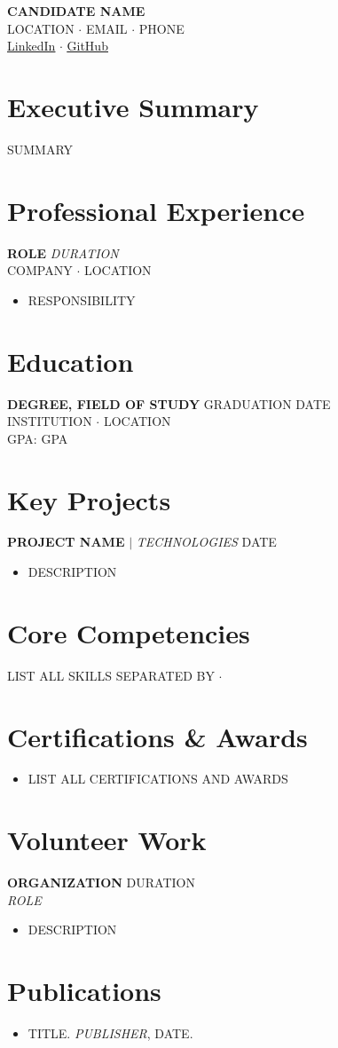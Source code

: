 \documentclass[letterpaper,11pt]{article}
\newcommand{\resumeItem}[1]{\item\small{#1\vspace{-2pt}}}
\newcommand{\resumeItemListStart}{\begin{itemize}[leftmargin=*,topsep=2pt,itemsep=1pt]}
\newcommand{\resumeItemListEnd}{\end{itemize}\vspace{-4pt}}
\begin{document}
\begin{center}
  {\LARGE\scshape\bfseries CANDIDATE NAME} \\ \vspace{6pt}
  {\color{medgray}\small LOCATION $\cdot$ EMAIL $\cdot$ PHONE} \\ \vspace{2pt}
  {\color{medgray}\small \href{LINKEDIN}{\underline{LinkedIn}} $\cdot$ \href{GITHUB}{\underline{GitHub}}}
\end{center}

\vspace{8pt}

\section{Executive Summary}
\small SUMMARY

\section{Professional Experience}
\textbf{ROLE} \hfill \textit{DURATION} \\
{\small\scshape COMPANY} $\cdot$ \small LOCATION \vspace{4pt}
\resumeItemListStart
  \resumeItem{RESPONSIBILITY}
\resumeItemListEnd

\section{Education}
\textbf{DEGREE, FIELD OF STUDY} \hfill GRADUATION DATE \\
{\small\scshape INSTITUTION} $\cdot$ LOCATION \\
\small GPA: GPA

\section{Key Projects}
\textbf{PROJECT NAME} $|$ \textit{TECHNOLOGIES} \hfill DATE
\resumeItemListStart
  \resumeItem{DESCRIPTION}
\resumeItemListEnd

\section{Core Competencies}
\small LIST ALL SKILLS SEPARATED BY $\cdot$

\section{Certifications \& Awards}
\resumeItemListStart
  \resumeItem{LIST ALL CERTIFICATIONS AND AWARDS}
\resumeItemListEnd

\section{Volunteer Work}
\textbf{ORGANIZATION} \hfill DURATION \\
\textit{ROLE}
\resumeItemListStart
  \resumeItem{DESCRIPTION}
\resumeItemListEnd

\section{Publications}
\resumeItemListStart
  \resumeItem{TITLE. \textit{PUBLISHER}, DATE.}
\resumeItemListEnd
\end{document}
